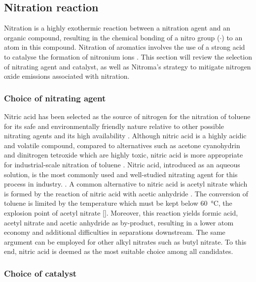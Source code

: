 \subsection{Nitration reaction}

Nitration is a highly exothermic reaction between a nitration agent and an organic compound, resulting in the chemical bonding of a nitro group ($\cdot$) to an atom in this compound. Nitration of aromatics involves the use of a strong acid to catalyse the formation of nitronium ions . This section will review the selection of nitrating agent and catalyst, as well as Nitroma's strategy to mitigate nitrogen oxide emissions associated with nitration.

\subsubsection{Choice of nitrating agent}

Nitric acid has been selected as the source of nitrogen for the nitration of toluene for its safe and environmentally friendly nature relative to other possible nitrating agents and its high availability \cite{miller_kinetics_1964, sreedhar_scientific_2013}. Although nitric acid is a highly acidic and volatile compound, compared to alternatives such as acetone cyanohydrin and dinitrogen tetroxide which are highly toxic, nitric acid is more appropriate for industrial-scale nitration of toluene \cite{dagade_nitration_2002, sreedhar_scientific_2013}. Nitric acid, introduced as an aqueous solution, is the most commonly used and well-studied nitrating agent for this process in industry. \cite{bowers_toluidines_2000}. A common alternative to nitric acid is acetyl nitrate which is formed by the reaction of nitric acid with acetic anhydride \cite{vassena_selective_1999}. The conversion of toluene is limited by the temperature which must be kept below \SI{60}{\celsius}, the explosion point of acetyl nitrate []. Moreover, this reaction yields formic acid, acetyl nitrate and acetic anhydride as by-product, resulting in a lower atom economy and additional difficulties in separations downstream. The same argument can be employed for other alkyl nitrates such as butyl nitrate. To this end, nitric acid is deemed as the most suitable choice among all candidates.


\subsubsection{Choice of catalyst}

